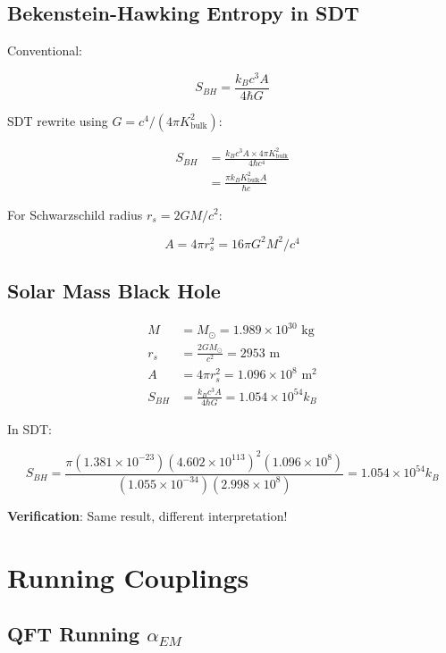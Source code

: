 \documentclass{article}
\begin{document}
\subsection{Bekenstein-Hawking Entropy in SDT}

Conventional:

\begin{equation}
S_{BH} = \frac{k_B c^3 A}{4 \hbar G}
\end{equation}

SDT rewrite using $G = c^4/(4\pi K_{\text{bulk}}^2)$:

\begin{align}
S_{BH} &= \frac{k_B c^3 A \times 4\pi K_{\text{bulk}}^2}{4\hbar c^4} \\
&= \frac{\pi k_B K_{\text{bulk}}^2 A}{\hbar c}
\end{align}

For Schwarzschild radius $r_s = 2GM/c^2$:

\begin{equation}
A = 4\pi r_s^2 = 16\pi G^2 M^2/c^4
\end{equation}

\subsection{Solar Mass Black Hole}

\begin{align}
M &= M_\odot = 1.989 \times 10^{30} \text{ kg} \\
r_s &= \frac{2GM_\odot}{c^2} = 2953 \text{ m} \\
A &= 4\pi r_s^2 = 1.096 \times 10^8 \text{ m}^2 \\
S_{BH} &= \frac{k_B c^3 A}{4\hbar G} = 1.054 \times 10^{54} k_B
\end{align}

In SDT:

\begin{equation}
S_{BH} = \frac{\pi (1.381 \times 10^{-23}) (4.602 \times 10^{113})^2 (1.096 \times 10^8)}{(1.055 \times 10^{-34})(2.998 \times 10^8)} = 1.054 \times 10^{54} k_B
\end{equation}

\textbf{Verification}: Same result, different interpretation!

\section{Running Couplings}

\subsection{QFT Running $\alpha_{EM}$}
\end{document}
